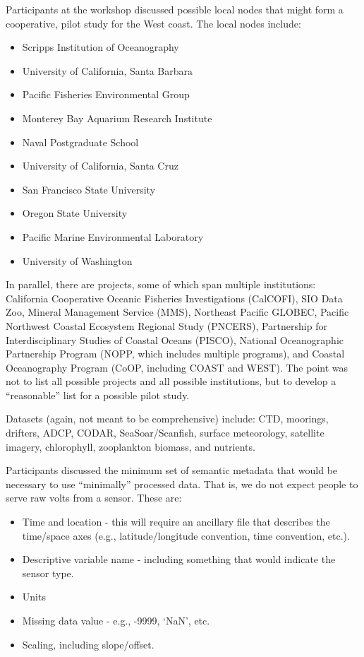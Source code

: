 Participants at the workshop discussed possible local nodes that might form a 
cooperative, pilot study for the West coast.  The local nodes include:

\begin{itemize}
\item Scripps Institution of Oceanography
\item University of California, Santa Barbara
\item Pacific Fisheries Environmental Group
\item Monterey Bay Aquarium Research Institute
\item Naval Postgraduate School
\item University of California, Santa Cruz
\item San Francisco State University
\item Oregon State University
\item Pacific Marine Environmental Laboratory
\item University of Washington
\end{itemize}

In parallel, there are projects, some of which span multiple
institutions: California Cooperative Oceanic Fisheries Investigations
(CalCOFI), SIO Data Zoo, Mineral Management Service (MMS), Northeast
Pacific GLOBEC, Pacific Northwest Coastal Ecosystem Regional Study
(PNCERS), Partnership for Interdisciplinary Studies of Coastal Oceans
(PISCO), National Oceanographic Partnership Program (NOPP, which
includes multiple programs), and Coastal Oceanography Program (CoOP,
including COAST and WEST).  The point was not to list all possible
projects and all possible institutions, but to develop a
``reasonable'' list for a possible pilot study.

Datasets (again, not meant to be comprehensive) include: CTD,
moorings, drifters, ADCP, CODAR, SeaSoar/Scanfish, surface
meteorology, satellite imagery, chlorophyll, zooplankton biomass, and
nutrients.

Participants discussed the minimum set of semantic metadata that would
be necessary to use ``minimally'' processed data.  That is, we do not
expect people to serve raw volts from a sensor.  These are:

\begin{itemize}
\item Time and location - this will require an ancillary file that
  describes the time/space axes (e.g., latitude/longitude convention,
  time convention, etc.).
\item Descriptive variable name - including something that would
  indicate the sensor type.
\item Units
\item Missing data value - e.g., -9999, `NaN', etc.
\item Scaling, including slope/offset.
\end{itemize}

